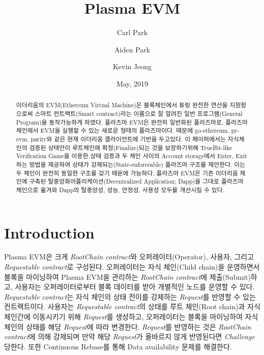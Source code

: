 \documentclass[letterpaper, 11pt]{article}
\title{Plasma EVM}
\author[1]{Carl Park}
\author[1]{Aiden Park}
\author[1]{Kevin Jeong}
\affil[1]{Onther Inc.}
\date{May, 2019}
\begin{document}
\maketitle

\begin{abstract}
\begin{CJK}{UTF8}{mj}
이더리움의 EVM(Ethereum Virtual Machine)은 블록체인에서 튜링 완전한 연산을 지원함으로써 스마트 컨트랙트(Smart contract)라는 이름으로 잘 알려진 일반 프로그램(General Program)을 동작가능하게 하였다. 플라즈마 EVM은 완전히 일반화된 플라즈마로, 플라즈마 체인에서 EVM을 실행할 수 있는 새로운 형태의 플라즈마이다. 때문에 go-ethereum, py-evm, parity와 같은 현재 이더리움 클라이언트에 기반을 두고있다. 이 페이퍼에서는 자식체인의 검증된 상태만이 루트체인에 확정(Finalize)되는 것을 보장하기위해 TrueBit-like Verification Game을 이용한 상태 검증과 두 체인 사이의 Account storage에서 Enter, Exit하는 방법을 제공하여 상태가 강제되는(State-enforceable) 플라즈마 구조를 제안한다. 이는 두 체인이 완전히 동일한 구조를 갖기 때문에 가능하다. 플라즈마 EVM은 기존 이더리움 체인에 구축된 탈중앙화어플리케이션(Decentralized Application; Dapp)을 그대로 플라즈마 체인으로 옮겨와 Dapp의 탈중앙성, 성능, 안정성, 사용성 모두를 개선시킬 수 있다.
\end{CJK}
\end{abstract}

\section{Introduction} \label{sec:childchain}
\begin{CJK}{UTF8}{mj}
Plasma EVM은 크게 \emph{RootChain contract}와 오퍼레이터(Operator), 사용자, 그리고 \emph{Requestable contract}로 구성된다. 오퍼레이터는 자식 체인(Child chain)을 운영하면서 블록을 마이닝하여 Plasma EVM을 관리하는 \emph{RootChain contract}에 제출(Submit)하고, 사용자는 오퍼레이터로부터 블록 데이터를 받아 개별적인 노드를 운영할 수 있다. \emph{Requestable contract}는 자식 체인의 상태 전이를 강제하는 \emph{Request}를 반영할 수 있는 컨트랙트이다. 사용자는 \emph{Requestable contract}의 상태를 루트 체인(Root chain)과 자식 체인간에 이동시키기 위해 \emph{Request}를 생성하고, 오퍼레이터는 블록을 마이닝하여 자식 체인의 상태를 해당 \emph{Request}에 따라 변경한다. \emph{Request}를 반영하는 것은 \emph{RootChain contract}에 의해 강제되며 만약 해당 \emph{Request}가 올바르지 않게 반영된다면 \emph{Challenge} 당한다. 또한 Continuous Rebase를 통해 Data availability 문제를 해결한다.


\end{CJK}
\end{document}
